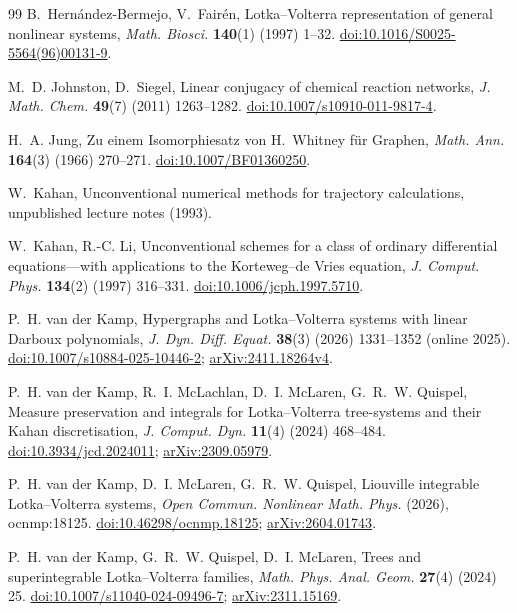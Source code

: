 \documentclass[11pt,a4paper]{article}
\theoremstyle{definition}
\theoremstyle{remark}
\begin{document}
\begin{thebibliography}{99}
 B.~Hern\'andez-Bermejo, V.~Fair\'en, Lotka--Volterra representation of general nonlinear systems, \emph{Math. Biosci.} \textbf{140}(1) (1997) 1--32. \href{https://doi.org/10.1016/S0025-5564(96)00131-9}{doi:10.1016/S0025-5564(96)00131-9}.

 M.~D. Johnston, D.~Siegel, Linear conjugacy of chemical reaction networks, \emph{J. Math. Chem.} \textbf{49}(7) (2011) 1263--1282. \href{https://doi.org/10.1007/s10910-011-9817-4}{doi:10.1007/s10910-011-9817-4}.

 H.~A. Jung, Zu einem Isomorphiesatz von H.~Whitney f\"ur Graphen, \emph{Math. Ann.} \textbf{164}(3) (1966) 270--271. \href{https://doi.org/10.1007/BF01360250}{doi:10.1007/BF01360250}.

 W.~Kahan, Unconventional numerical methods for trajectory calculations, unpublished lecture notes (1993).

 W.~Kahan, R.-C. Li, Unconventional schemes for a class of ordinary differential equations---with applications to the Korteweg--de Vries equation, \emph{J. Comput. Phys.} \textbf{134}(2) (1997) 316--331. \href{https://doi.org/10.1006/jcph.1997.5710}{doi:10.1006/jcph.1997.5710}.

 P.~H. van der Kamp, Hypergraphs and Lotka--Volterra systems with linear Darboux polynomials, \emph{J. Dyn. Diff. Equat.} \textbf{38}(3) (2026) 1331--1352 (online 2025). \href{https://doi.org/10.1007/s10884-025-10446-2}{doi:10.1007/s10884-025-10446-2}; \href{https://arxiv.org/abs/2411.18264v4}{arXiv:2411.18264v4}.

 P.~H. van der Kamp, R.~I. McLachlan, D.~I. McLaren, G.~R.~W. Quispel, Measure preservation and integrals for Lotka--Volterra tree-systems and their Kahan discretisation, \emph{J. Comput. Dyn.} \textbf{11}(4) (2024) 468--484. \href{https://doi.org/10.3934/jcd.2024011}{doi:10.3934/jcd.2024011}; \href{https://arxiv.org/abs/2309.05979}{arXiv:2309.05979}.

 P.~H. van der Kamp, D.~I. McLaren, G.~R.~W. Quispel, Liouville integrable Lotka--Volterra systems, \emph{Open Commun. Nonlinear Math. Phys.} (2026), ocnmp:18125. \href{https://doi.org/10.46298/ocnmp.18125}{doi:10.46298/ocnmp.18125}; \href{https://arxiv.org/abs/2604.01743}{arXiv:2604.01743}.

 P.~H. van der Kamp, G.~R.~W. Quispel, D.~I. McLaren, Trees and superintegrable Lotka--Volterra families, \emph{Math. Phys. Anal. Geom.} \textbf{27}(4) (2024) 25. \href{https://doi.org/10.1007/s11040-024-09496-7}{doi:10.1007/s11040-024-09496-7}; \href{https://arxiv.org/abs/2311.15169}{arXiv:2311.15169}.


\end{thebibliography}
\end{document}
